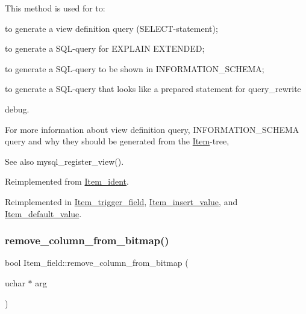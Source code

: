 This method is used for to\+:
\begin{DoxyItemize}
\item to generate a view definition query (S\+E\+L\+E\+CT-\/statement);
\item to generate a S\+QL-\/query for E\+X\+P\+L\+A\+IN E\+X\+T\+E\+N\+D\+ED;
\item to generate a S\+QL-\/query to be shown in I\+N\+F\+O\+R\+M\+A\+T\+I\+O\+N\+\_\+\+S\+C\+H\+E\+MA;
\item to generate a S\+QL-\/query that looks like a prepared statement for query\+\_\+rewrite
\item debug.
\end{DoxyItemize}

For more information about view definition query, I\+N\+F\+O\+R\+M\+A\+T\+I\+O\+N\+\_\+\+S\+C\+H\+E\+MA query and why they should be generated from the \mbox{\hyperlink{classItem}{Item}}-\/tree, \begin{DoxySeeAlso}{See also}
mysql\+\_\+register\+\_\+view(). 
\end{DoxySeeAlso}


Reimplemented from \mbox{\hyperlink{classItem__ident_abbedbcfff5de0cc721c9be3657fcb3ad}{Item\+\_\+ident}}.



Reimplemented in \mbox{\hyperlink{classItem__trigger__field_a68115abf242013d5b319a0c3c58c5384}{Item\+\_\+trigger\+\_\+field}}, \mbox{\hyperlink{classItem__insert__value_abbba2f565d5a63803b693a03f7184d14}{Item\+\_\+insert\+\_\+value}}, and \mbox{\hyperlink{classItem__default__value_adc863c4577d7c10a0cbf1c006c8087a6}{Item\+\_\+default\+\_\+value}}.

\mbox{\label{classItem__field_a4df6afee14222812ccadfe9b1e32d9ee}} 
\subsubsection{\texorpdfstring{remove\+\_\+column\+\_\+from\+\_\+bitmap()}{remove\_column\_from\_bitmap()}}
{\footnotesize\ttfamily bool Item\+\_\+field\+::remove\+\_\+column\+\_\+from\+\_\+bitmap (\begin{DoxyParamCaption}\item[{uchar $\ast$}]{arg }\end{DoxyParamCaption})\hspace{0.3cm}{\ttfamily [virtual]}}

